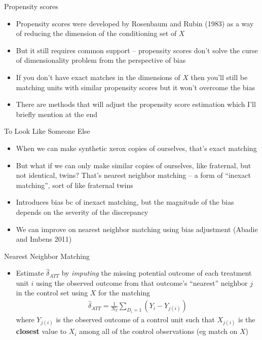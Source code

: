\documentclass{beamer}
\begin{document}
\begin{frame}{Propensity scores}

\begin{itemize}
\item Propensity scores were developed by Rosenbaum and Rubin (1983) as a way of reducing the dimension of the conditioning set of $X$
\item But it still requires common support -- propensity scores don't solve the curse of dimensionality problem from the perspective of bias
\item If you don't have exact matches in the dimensions of $X$ then you'll still be matching units with similar propensity scores but it won't overcome the bias
\item There are methods that will adjust the propensity score estimation which I'll briefly mention at the end

\end{itemize}

\end{frame}




\begin{frame}{To Look Like Someone Else}

\begin{itemize}
\item When we can make synthetic xerox copies of ourselves, that's exact matching
\item But what if we can only make similar copies of ourselves, like fraternal, but not identical, twins? That's nearest neighbor matching -- a form of ``inexact matching'', sort of like fraternal twins
\item Introduces bias bc of inexact matching, but the magnitude of the bias depends on the severity of the discrepancy
\item We can improve on nearest neighbor matching using bias adjustment (Abadie and Imbens 2011) 
\end{itemize}

\end{frame}

\begin{frame}{Nearest Neighbor Matching}
	
	\begin{itemize}
	\item Estimate $\widehat{\delta}_{ATT}$ by \emph{imputing} the missing potential outcome of each treatment unit $i$ using the observed outcome from that outcome's ``nearest'' neighbor $j$ in the control set using $X$ for the matching
		\begin{eqnarray*}
		\widehat{\delta}_{ATT} = \frac{1}{N_T}\sum_{D_i=1} (Y_i - Y_{j(i)})
		\end{eqnarray*}where $Y_{j(i)}$ is the observed outcome of a control unit such that $X_{j(i)}$ is the \textbf{closest} value to $X_i$ among all of the control observations (eg match on $X$)
	\end{itemize}
\end{frame}
\end{document}
